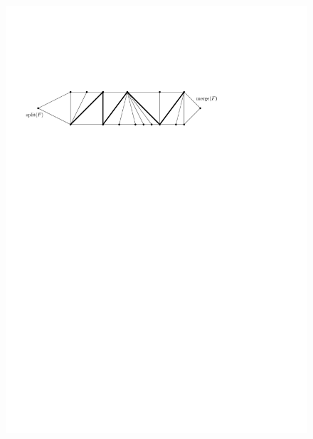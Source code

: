     \begin{figure}[h]
      \centering
      \includegraphics[scale=.9]{rectangularDuals/img/fans}
      \caption{}
      \label{fig:uni:fans}
    \end{figure}


